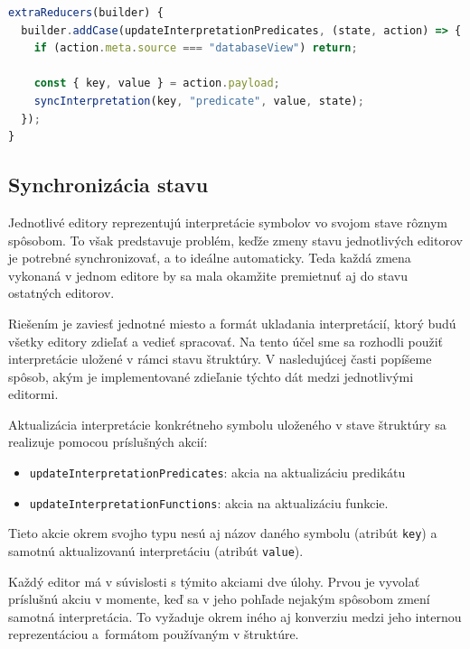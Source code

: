 \begin{lstlisting}[float,language=JavaScript,caption={Extra reducer používaný pri aktualizácii databázového editora.},label=prog:extra_red]
extraReducers(builder) {
  builder.addCase(updateInterpretationPredicates, (state, action) => {
    if (action.meta.source === "databaseView") return;

    const { key, value } = action.payload;
    syncInterpretation(key, "predicate", value, state);
  });
}
\end{lstlisting}

\subsection{Synchronizácia stavu}
Jednotlivé editory reprezentujú interpretácie symbolov vo svojom stave rôznym spôsobom. To však predstavuje problém, keďže zmeny stavu jednotlivých editorov je potrebné synchronizovať, a to ideálne automaticky. Teda každá zmena vykonaná v jednom editore by sa mala okamžite premietnuť aj do stavu ostatných editorov.


Riešením je zaviesť jednotné miesto a formát ukladania interpretácií, ktorý budú všetky editory zdieľať a vedieť spracovať. Na tento účel sme sa rozhodli použiť interpretácie uložené v rámci stavu štruktúry. V nasledujúcej časti popíšeme spôsob, akým je implementované zdieľanie týchto dát medzi jednotlivými editormi.

Aktualizácia interpretácie konkrétneho symbolu uloženého v stave štruktúry sa realizuje pomocou príslušných akcií:
\begin{itemize}
  \item \texttt{updateInterpretationPredicates}: akcia na aktualizáciu predikátu
  \item \texttt{updateInterpretationFunctions}: akcia na aktualizáciu funkcie.
\end{itemize}
Tieto akcie okrem svojho typu nesú aj názov daného symbolu (atribút \texttt{key}) a samotnú aktualizovanú interpretáciu (atribút \texttt{value}).

Každý editor má v súvislosti s týmito akciami dve úlohy. Prvou je vyvolať príslušnú akciu v momente, keď sa v jeho pohľade nejakým spôsobom zmení samotná interpretácia. To vyžaduje okrem iného aj konverziu medzi jeho internou reprezentáciou a~formátom používaným v štruktúre.

